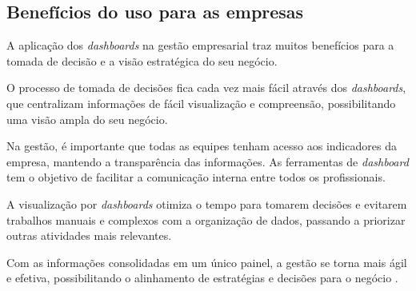 \subsection{Benefícios do uso para as empresas}

\indent
\par A aplicação dos \textit{dashboards} na gestão empresarial traz muitos benefícios para a tomada de decisão e a visão estratégica do seu negócio.

\par O processo de tomada de decisões fica cada vez mais fácil através dos \textit{dashboards}, que centralizam informações de fácil visualização e compreensão, possibilitando uma visão ampla do seu negócio.

\par Na gestão, é importante que todas as equipes tenham acesso aos indicadores da empresa, mantendo a transparência das informações. As ferramentas de \textit{dashboard} tem o objetivo de facilitar a comunicação interna entre todos os profissionais.

\par A visualização por \textit{dashboards} otimiza o tempo para tomarem decisões e evitarem trabalhos manuais e complexos com a organização de dados, passando a priorizar outras atividades mais relevantes.

\par Com as informações consolidadas em um único painel, a gestão se torna mais ágil e efetiva, possibilitando o alinhamento de estratégias e decisões para o negócio \cite{Tecnicon}.

